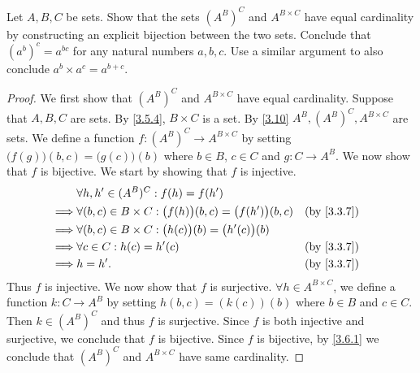 \begin{ex}\label{ex:3.6.6}
  Let \(A, B, C\) be sets.
  Show that the sets \((A^B)^C\) and \(A^{B \times C}\) have equal cardinality by constructing an explicit bijection between the two sets.
  Conclude that \((a^b)^c = a^{bc}\) for any natural numbers \(a, b, c\).
  Use a similar argument to also conclude \(a^b \times a^c = a^{b+c}\).
\end{ex}

\begin{proof}
  We first show that \((A^B)^C\) and \(A^{B \times C}\) have equal cardinality.
  Suppose that \(A, B, C\) are sets.
  By \cref{3.5.4}, \(B \times C\) is a set.
  By \cref{3.10} \(A^B, (A^B)^C, A^{B \times C}\) are sets.
  We define a function \(f : (A^B)^C \to A^{B \times C}\) by setting \(\big(f(g)\big)(b, c) = \big(g(c)\big)(b)\) where \(b \in B\), \(c \in C\) and \(g : C \to A^B\).
  We now show that \(f\) is bijective.
  We start by showing that \(f\) is injective.
  \begin{align*}
             & \forall h, h' \in (A^B)^C : f(h) = f(h')                                                     \\
    \implies & \forall (b, c) \in B \times C : \big(f(h)\big)(b, c) = \big(f(h')\big)(b, c) &  & \by{3.3.7} \\
    \implies & \forall (b, c) \in B \times C : \big(h(c)\big)(b) = \big(h'(c)\big)(b)                       \\
    \implies & \forall c \in C : h(c) = h'(c)                                               &  & \by{3.3.7} \\
    \implies & h = h'.                                                                      &  & \by{3.3.7}
  \end{align*}
  Thus \(f\) is injective.
  We now show that \(f\) is surjective.
  \(\forall h \in A^{B \times C}\), we define a function \(k : C \to A^B\) by setting \(h(b, c) = (k(c))(b)\) where \(b \in B\) and \(c \in C\).
  Then \(k \in (A^B)^C\) and thus \(f\) is surjective.
  Since \(f\) is both injective and surjective, we conclude that \(f\) is bijective.
  Since \(f\) is bijective, by \cref{3.6.1} we conclude that \((A^B)^C\) and \(A^{B \times C}\) have same cardinality.


\end{proof}
